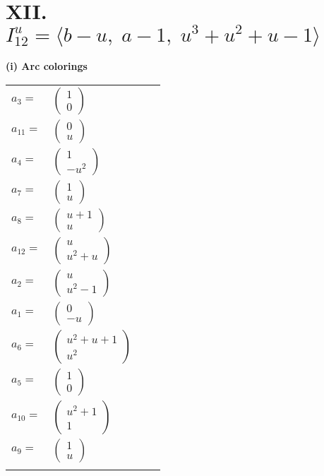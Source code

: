\documentclass[1p]{elsarticle_modified}
\theoremstyle{definition}
\begin{document}
\centering \section*{XII. $I^u_{12}= \langle b- u,\;a-1,\;u^3+u^2+u-1 \rangle$}
\flushleft \textbf{(i) Arc colorings}\\
\begin{tabular}{m{7pt} m{180pt} m{7pt} m{180pt} }
\flushright $a_{3}=$&$\begin{pmatrix}1\\0\end{pmatrix}$ \\
\flushright $a_{11}=$&$\begin{pmatrix}0\\u\end{pmatrix}$ \\
\flushright $a_{4}=$&$\begin{pmatrix}1\\- u^2\end{pmatrix}$ \\
\flushright $a_{7}=$&$\begin{pmatrix}1\\u\end{pmatrix}$ \\
\flushright $a_{8}=$&$\begin{pmatrix}u+1\\u\end{pmatrix}$ \\
\flushright $a_{12}=$&$\begin{pmatrix}u\\u^2+u\end{pmatrix}$ \\
\flushright $a_{2}=$&$\begin{pmatrix}u\\u^2-1\end{pmatrix}$ \\
\flushright $a_{1}=$&$\begin{pmatrix}0\\- u\end{pmatrix}$ \\
\flushright $a_{6}=$&$\begin{pmatrix}u^2+u+1\\u^2\end{pmatrix}$ \\
\flushright $a_{5}=$&$\begin{pmatrix}1\\0\end{pmatrix}$ \\
\flushright $a_{10}=$&$\begin{pmatrix}u^2+1\\1\end{pmatrix}$ \\
\flushright $a_{9}=$&$\begin{pmatrix}1\\u\end{pmatrix}$\\&\end{tabular}
\end{document}
